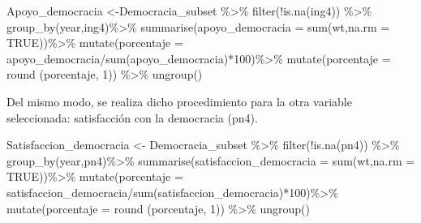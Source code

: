 \documentclass[
]{book}
\newenvironment{Shaded}{\begin{snugshade}}{\end{snugshade}}
\newcommand{\AttributeTok}[1]{\textcolor[rgb]{0.77,0.63,0.00}{#1}}
\newcommand{\ConstantTok}[1]{\textcolor[rgb]{0.00,0.00,0.00}{#1}}
\newcommand{\DecValTok}[1]{\textcolor[rgb]{0.00,0.00,0.81}{#1}}
\newcommand{\FunctionTok}[1]{\textcolor[rgb]{0.00,0.00,0.00}{#1}}
\newcommand{\NormalTok}[1]{#1}
\newcommand{\OtherTok}[1]{\textcolor[rgb]{0.56,0.35,0.01}{#1}}
\newcommand{\SpecialCharTok}[1]{\textcolor[rgb]{0.00,0.00,0.00}{#1}}
\begin{document}
\begin{Shaded}
\begin{Highlighting}[]
\NormalTok{Apoyo\_democracia }\OtherTok{\textless{}{-}}\NormalTok{Democracia\_subset }\SpecialCharTok{\%\textgreater{}\%}
  \FunctionTok{filter}\NormalTok{(}\SpecialCharTok{!}\FunctionTok{is.na}\NormalTok{(ing4)) }\SpecialCharTok{\%\textgreater{}\%}
  \FunctionTok{group\_by}\NormalTok{(year,ing4)}\SpecialCharTok{\%\textgreater{}\%}
  \FunctionTok{summarise}\NormalTok{(}\AttributeTok{apoyo\_democracia =} \FunctionTok{sum}\NormalTok{(wt,}\AttributeTok{na.rm =} \ConstantTok{TRUE}\NormalTok{))}\SpecialCharTok{\%\textgreater{}\%}
  \FunctionTok{mutate}\NormalTok{(}\AttributeTok{porcentaje =}\NormalTok{ apoyo\_democracia}\SpecialCharTok{/}\FunctionTok{sum}\NormalTok{(apoyo\_democracia)}\SpecialCharTok{*}\DecValTok{100}\NormalTok{)}\SpecialCharTok{\%\textgreater{}\%}
  \FunctionTok{mutate}\NormalTok{(}\AttributeTok{porcentaje =} \FunctionTok{round}\NormalTok{ (porcentaje, }\DecValTok{1}\NormalTok{)) }\SpecialCharTok{\%\textgreater{}\%}
  \FunctionTok{ungroup}\NormalTok{()}
\end{Highlighting}
\end{Shaded}

Del mismo modo, se realiza dicho procedimiento para la otra variable seleccionada: satisfacción con la democracia (pn4).

\begin{Shaded}
\begin{Highlighting}[]
\NormalTok{Satisfaccion\_democracia }\OtherTok{\textless{}{-}}\NormalTok{ Democracia\_subset }\SpecialCharTok{\%\textgreater{}\%}
  \FunctionTok{filter}\NormalTok{(}\SpecialCharTok{!}\FunctionTok{is.na}\NormalTok{(pn4)) }\SpecialCharTok{\%\textgreater{}\%}
  \FunctionTok{group\_by}\NormalTok{(year,pn4)}\SpecialCharTok{\%\textgreater{}\%}
  \FunctionTok{summarise}\NormalTok{(}\AttributeTok{satisfaccion\_democracia =} \FunctionTok{sum}\NormalTok{(wt,}\AttributeTok{na.rm =} \ConstantTok{TRUE}\NormalTok{))}\SpecialCharTok{\%\textgreater{}\%}
  \FunctionTok{mutate}\NormalTok{(}\AttributeTok{porcentaje =}\NormalTok{ satisfaccion\_democracia}\SpecialCharTok{/}\FunctionTok{sum}\NormalTok{(satisfaccion\_democracia)}\SpecialCharTok{*}\DecValTok{100}\NormalTok{)}\SpecialCharTok{\%\textgreater{}\%}
  \FunctionTok{mutate}\NormalTok{(}\AttributeTok{porcentaje =} \FunctionTok{round}\NormalTok{ (porcentaje, }\DecValTok{1}\NormalTok{)) }\SpecialCharTok{\%\textgreater{}\%}
  \FunctionTok{ungroup}\NormalTok{()}
\end{Highlighting}
\end{Shaded}
\end{document}
